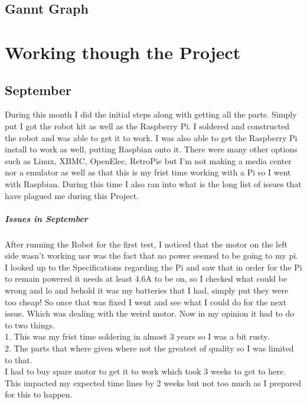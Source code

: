 \documentclass[13ptletterpaper]{paper}
\newcommand\tab[1][1cm]{\hspace*{#1}}
\begin{document}
\begin{flushleft}
		\subsection{Gannt Graph}
		\section{Working though the Project}
		\subsection{September}
		\tab During this month I did the initial steps along with getting all the parts. Simply put I got the robot kit as well as the Raspberry Pi. I soldered and constructed the robot and was able to get it to work. I was also able to get the Raspberry Pi install to work as well, putting Raspbian onto it. There were many other options such as Linux, XBMC, OpenElec, RetroPie but I'm not making a media center nor a emulator as well as that this is my frist time working with a Pi so I went with Raspbian. During this time I also ran into what is the long list of issues that have plagued me during this Project.
		\subparagraph{Issues in September} After running the Robot for the first test, I noticed that the motor on the left side wasn't working nor was the fact that no power seemed to be going to my pi. I looked up to the Specifications regarding the Pi and saw that in order for the Pi to remain powered it needs at least 4.6A to be on, so I checked what could be wrong and lo and behold it was my batteries that I had, simply put they were too cheap! So once that was fixed I went and see what I could do for the next issue. Which was dealing with the weird motor. Now in my opinion it had to do to two things. \\
		\tab 1. This was my frist time soldering in almost 3 years so I was a bit rusty.\\
		\tab 2. The parts that where given where not the greatest of quality so I was limited to that.\\
		I had to buy spare motor to get it to work which took 3 weeks to get to here. This impacted my expected time lines by 2 weeks but not too much as I prepared for this to happen. \\
		

\end{flushleft}
\end{document}
